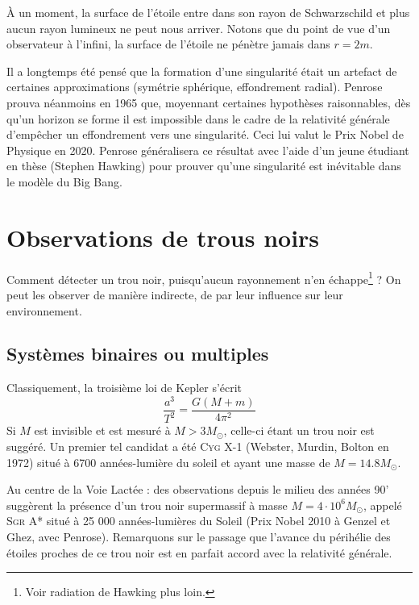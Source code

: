 À un moment, la surface de l'étoile entre dans son rayon de Schwarzschild et plus aucun rayon lumineux ne peut nous arriver. Notons que du point de vue d'un observateur à l'infini, la surface de l'étoile ne pénètre jamais dans $r=2m$.

Il a longtemps été pensé que la formation d'une singularité était un artefact de certaines approximations (symétrie sphérique, effondrement radial). Penrose prouva néanmoins en 1965 que, moyennant certaines hypothèses raisonnables, dès qu'un horizon se forme il est impossible dans le cadre de la relativité générale d'empêcher un effondrement vers une singularité. Ceci lui valut le Prix Nobel de Physique en 2020. Penrose généralisera ce résultat avec l'aide d'un jeune étudiant en thèse (Stephen Hawking) pour prouver qu'une singularité est inévitable dans le modèle du Big Bang.
\section{Observations de trous noirs}
Comment détecter un trou noir, puisqu'aucun rayonnement n'en échappe\footnote{Voir radiation de Hawking plus loin.} ? On peut les observer de manière indirecte, de par leur influence sur leur environnement.
\subsection{Systèmes binaires ou multiples}
Classiquement, la troisième loi de Kepler s'écrit
\begin{equation}
    \frac{a^3}{T^2} = \frac{G (M+m)}{4 \pi^2}
\end{equation}
Si $M$ est invisible et est mesuré à $M > 3M_\odot$, celle-ci étant un trou noir est suggéré. Un premier tel candidat a été \textsc{Cyg X-1} (Webster, Murdin, Bolton en 1972) situé à 6700 années-lumière du soleil et ayant une masse de $M = 14.8 M_\odot$.

Au centre de la Voie Lactée : des observations depuis le milieu des années 90' suggèrent la présence d'un trou noir supermassif à masse $M = 4 \cdot 10^6 M_\odot$, appelé \textsc{Sgr A*} situé à 25 000 années-lumières du Soleil (Prix Nobel 2010 à Genzel et Ghez, avec Penrose). Remarquons sur le passage que l'avance du périhélie des étoiles proches de ce trou noir est en parfait accord avec la relativité générale.
